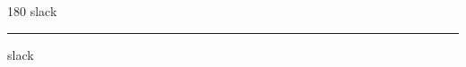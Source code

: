 
\begin{frame}
\begin{center}
\begin{turn}{180}
{\fontsize{2.5cm}{1em}\selectfont slack}
\end{turn}
\vspace{1em}\par  
\hrule
\vspace{1em}\par  
{\fontsize{2.5cm}{1em}\selectfont slack}
\end{center}
\end{frame}
